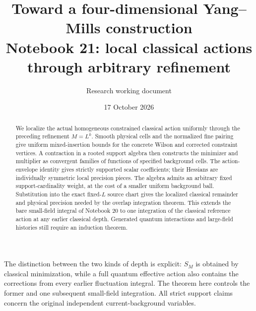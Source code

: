 \documentclass[11pt]{article}
\title{Toward a four-dimensional Yang--Mills construction\\
\large Notebook 21: local classical actions through arbitrary refinement}
\author{Research working document}
\date{17 October 2026}
\theoremstyle{remark}
\begin{document}
\maketitle
\begin{abstract}
We localize the actual homogeneous constrained classical action
uniformly through the preceding refinement $M=L^k$. Smooth
physical cells and the normalized fine pairing give uniform
mixed-insertion bounds for the concrete Wilson and corrected
constraint vertices. A contraction in a rooted support algebra
then constructs the minimizer and multiplier as convergent
families of functions of specified background cells. The
action-envelope identity gives strictly supported scalar
coefficients; their Hessians are individually symmetric local
precision pieces. The algebra admits an arbitrary fixed
support-cardinality weight, at the cost of a smaller uniform
background ball. Substitution into the exact fixed-$L$ source
chart gives the localized classical remainder and physical
precision needed by the overlap integration theorem. This
extends the bare small-field integral of Notebook 20 to one
integration of the classical reference action at any earlier
classical depth. Generated quantum interactions and large-field
histories still require an induction theorem.
\end{abstract}

The distinction between the two kinds of depth is explicit:
$S_M$ is obtained by classical minimization, while a full
quantum effective action also contains the corrections from
every earlier fluctuation integral. The theorem here controls
the former and one subsequent small-field integration. All
strict support claims concern the original independent
current-background variables.
\end{document}
